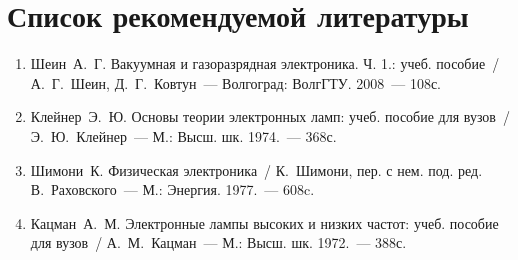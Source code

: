 \section*{Список рекомендуемой литературы}
\vspace{-1.5em}
\begin{enumerate}
    \singlespacing
    \itemsep -.5pt
    \item Шеин~А.~Г. Вакуумная и газоразрядная электроника. Ч. 1.: учеб.
    пособие~/ А.~Г.~Шеин, Д.~Г.~Ковтун~--- Волгоград: ВолгГТУ. 2008~--- 108с.
    \item Клейнер~Э.~Ю. Основы теории электронных ламп: учеб. пособие для
    вузов~/ Э.~Ю.~Клейнер~--- М.: Высш. шк. 1974.~--- 368с.
    \item Шимони~К. Физическая электроника~/ К.~Шимони, пер. с нем. под. ред.
    В.~Раховского~--- М.: Энергия. 1977.~--- 608c.
    \item Кацман~А.~М. Электронные лампы высоких и низких частот: учеб. пособие
    для вузов~/ А.~М.~Кацман~--- М.: Высш. шк. 1972.~--- 388с.
\end{enumerate}